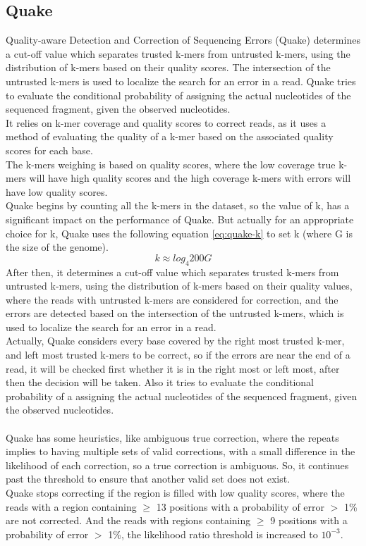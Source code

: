 \documentclass[12pt,openany]{llncs}
\begin{document}
\subsection{Quake}
Quality-aware Detection and Correction of Sequencing Errors (Quake) \cite{Quake} determines a cut-off value which separates trusted k-mers from untrusted k-mers, using the distribution of k-mers based on their quality scores. The intersection of the untrusted k-mers is used to localize the search for an error in a read. Quake tries to evaluate the conditional probability of assigning the actual nucleotides of the sequenced fragment, given the observed nucleotides.
\\
It relies on k-mer coverage and quality scores to correct reads, as it uses a method of evaluating the quality of a k-mer based on the associated quality scores for each base. 
\\
The k-mers weighing is based on quality scores, where the low coverage true k-mers will have high quality scores and the high coverage k-mers with errors will have low quality scores.
\\
Quake begins by counting all the k-mers in the dataset, so the value of k, has a significant impact on the performance of Quake. But actually for an appropriate choice for k, Quake uses the following equation \ref{eq:quake-k} to set k (where G is the size of the genome).
\begin{equation} \label{eq:quake-k}
 k \approx log_{4} 200G  
\end{equation}
After then, it determines a cut-off value which separates trusted k-mers from untrusted k-mers, using the distribution of k-mers based on their quality values, where the reads with untrusted k-mers are considered for correction, and the errors are detected based on the intersection of the untrusted k-mers, which is used to localize the search for an error in a read. 
\\
Actually, Quake considers every base covered by the right most trusted k-mer, and left most trusted k-mers to be correct, so if the errors are near the end of a read, it will be checked first whether it is in the right most or left most, after then the decision will be taken. Also it tries to evaluate the conditional probability of a assigning the actual nucleotides of the sequenced fragment, given the observed nucleotides.
\\
\\
Quake has some heuristics, like ambiguous true correction, where the repeats implies to having multiple sets of valid corrections, with a small difference in the likelihood of each correction, so a true correction is ambiguous. So, it continues past the threshold to ensure that another valid set does not exist. 
\\
Quake stops correcting if the region is filled with low quality scores, where the reads with a region containing $\geq$ 13 positions with a probability of error $>$ 1\% are not corrected. And the reads with regions containing $\geq$ 9 positions with a probability of error $>$ 1\%, the likelihood ratio threshold is increased to $10^{-3}$.
\end{document}
